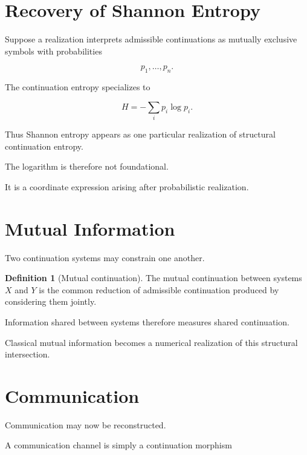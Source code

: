\documentclass[13pt,openany]{book}
\theoremstyle{plain}
\theoremstyle{definition}
\newtheorem{definition}{Definition}[chapter]
\begin{document}
\section{Recovery of Shannon Entropy}

Suppose a realization interprets admissible continuations as mutually exclusive
symbols with probabilities

\[
p_1,\ldots,p_n.
\]

The continuation entropy specializes to

\[
H
=
-\sum_i p_i\log p_i.
\]

Thus Shannon entropy appears as one particular realization of structural
continuation entropy.

The logarithm is therefore not foundational.

It is a coordinate expression arising after probabilistic realization.

\section{Mutual Information}

Two continuation systems may constrain one another.

\begin{definition}[Mutual continuation]
The mutual continuation between systems \(X\) and \(Y\) is the common reduction
of admissible continuation produced by considering them jointly.
\end{definition}

Information shared between systems therefore measures shared continuation.

Classical mutual information becomes a numerical realization of this structural
intersection.

\section{Communication}

Communication may now be reconstructed.

A communication channel is simply a continuation morphism
\end{document}
